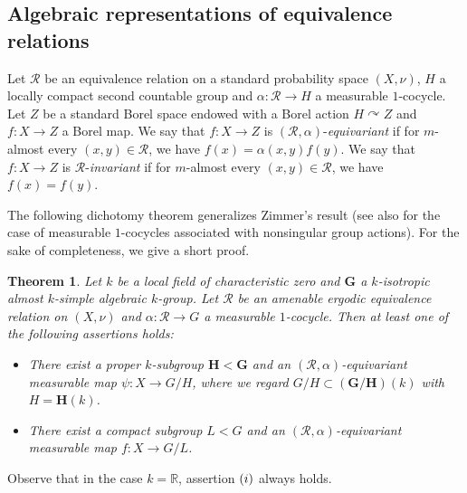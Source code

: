 \documentclass[11pt]{amsart}
\numberwithin{equation}{section}
\theoremstyle{plain}
\newtheorem{thm}{Theorem}[section]
\theoremstyle{definition}
\newcommand{\R}{\mathbb{R}}
\begin{document}
\subsection{Algebraic representations of equivalence relations}

Let $\mathscr R$ be an equivalence relation on a standard probability space $(X, \nu)$, $H$ a locally compact second countable group and $\alpha : \mathscr R \to H$ a measurable $1$-cocycle. Let $Z$ be a standard Borel space endowed with a Borel action $H \curvearrowright Z$ and $f : X \to Z$ a Borel map. We say that $f : X \to Z$ is $(\mathscr R, \alpha)$-{\em equivariant} if for $m$-almost every $(x, y) \in \mathscr R$, we have $f(x) = \alpha(x, y)f(y)$. We say that $f : X \to Z$ is $\mathscr R$-{\em invariant} if for $m$-almost every $(x, y) \in \mathscr R$, we have $f(x) = f(y)$.


The following dichotomy theorem generalizes Zimmer's result \cite[Theorem 9.2.3]{Zi84} (see also \cite[Theorem 6.1]{BDL14} for the case of measurable $1$-cocycles associated with nonsingular group actions). For the sake of completeness, we give a short proof.

\begin{thm}\label{thm-non-trivial-gate}
Let $k$ be a local field of characteristic zero and $\mathbf G$ a $k$-isotropic almost $k$-simple algebraic $k$-group. Let $\mathscr R$ be an amenable ergodic equivalence relation on $(X, \nu)$ and $\alpha : \mathscr R \to G$ a measurable $1$-cocycle. Then at least one of the following assertions holds:
\begin{itemize}
\item [$(\rm i)$] There exist a proper $k$-subgroup $\mathbf H < \mathbf G$ and an $(\mathscr R, \alpha)$-equivariant measurable map $\psi : X \to G/H$, where we regard $G/H \subset (\mathbf G/\mathbf H)(k)$ with $H = \mathbf H(k)$.

\item [$(\rm ii)$] There exist a compact subgroup $L < G$ and an $(\mathscr R, \alpha)$-equivariant measurable map $f : X \to G/L$.
\end{itemize}
\end{thm}
Observe that in the case $k = \R$, assertion $(\rm i)$ always holds.
\end{document}
